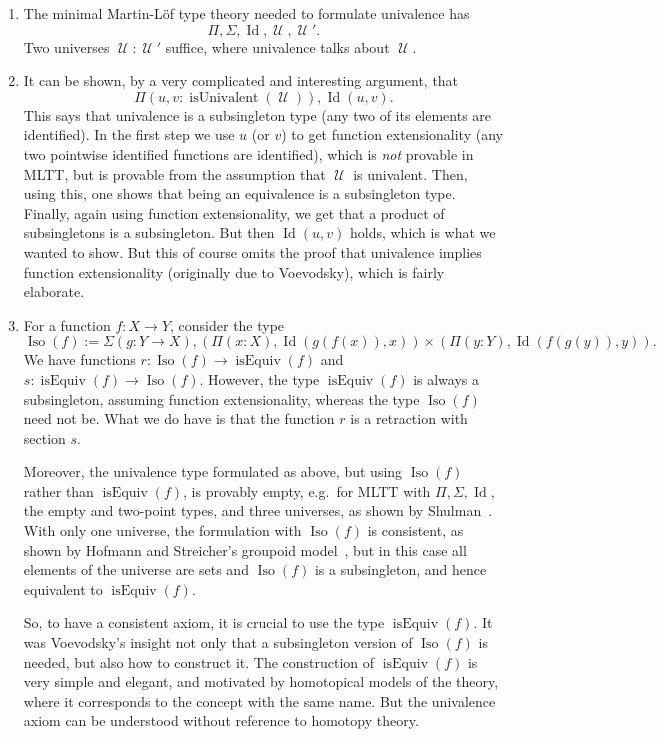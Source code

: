 \documentclass{article}
\newcommand{\Id}{\operatorname{Id}}
\newcommand{\U}{\operatorname{\mathcal{U}}}
\newcommand{\isEquiv}{\operatorname{isEquiv}}
\newcommand{\isUnivalent}{\operatorname{isUnivalent}}
\newcommand{\Iso}{\operatorname{Iso}}
\begin{document}
\begin{enumerate}
\item 
 The minimal Martin-L\"of type theory needed to formulate univalence
    has
    \[
      \Pi, \Sigma, \Id, \U, \U'.
    \]
    Two universes $\U :\U'$ suffice, where univalence talks about $\U$.
  
\item It can be shown, by a very complicated and interesting argument,
    that
    \[
     \Pi(u,v: \isUnivalent(\U)), \Id(u,v).
   \]
    This says that univalence is a subsingleton type (any two of its
    elements are identified). In the first step we use $u$ (or $v$) to get
    function extensionality (any two pointwise identified functions
    are identified), which is \emph{not} provable in MLTT, but is provable
    from the assumption that $\U$ is univalent. Then, using this, one
    shows that being an equivalence is a subsingleton type. Finally,
    again using function extensionality, we get that a product of
    subsingletons is a subsingleton. But then $\Id(u,v)$ holds, which is
    what we wanted to show. But this of course omits the proof that
    univalence implies function extensionality (originally due to
    Voevodsky), which is fairly elaborate.

 \item For a function $f:X\to Y$, consider the type
   \[
     \Iso(f) := \Sigma(g:Y\to X), (\Pi(x:X), \Id(g(f(x)),x)) \times  (\Pi(y:Y), \Id(f(g(y)),y)).
   \]
    We have functions $r:\Iso(f)\to \isEquiv(f)$ and
    $s:\isEquiv(f)\to \Iso(f)$. However, the type $\isEquiv(f)$ is always a
    subsingleton, assuming function extensionality, whereas the type
    $\Iso(f)$ need not be. What we do have is that the function $r$ is a
    retraction with section $s$.

    Moreover, the univalence type formulated as above, but using
    $\Iso(f)$ rather than $\isEquiv(f)$, is provably empty, e.g.\ for
    MLTT with $\Pi, \Sigma, \Id$, the empty and two-point types, and
    three universes, as shown by Shulman~\cite{shulman:e46}. With only
    one universe, the formulation with $\Iso(f)$ is consistent, as
    shown by Hofmann and Streicher's groupoid model~\cite{MR1686862},
    but in this case all elements of the universe are sets and
    $\Iso(f)$ is a subsingleton, and hence equivalent to
    $\isEquiv(f)$.
    
    So, to have a consistent axiom, it is crucial to use the type
    $\isEquiv(f)$. It was Voevodsky's insight not only that a
    subsingleton version of $\Iso(f)$ is needed, but also how to
    construct it. The construction of $\isEquiv(f)$ is very simple and
    elegant, and motivated by homotopical models of the theory, where
    it corresponds to the concept with the same name. But the
    univalence axiom can be understood without reference to homotopy
    theory.


\end{enumerate}
\end{document}
